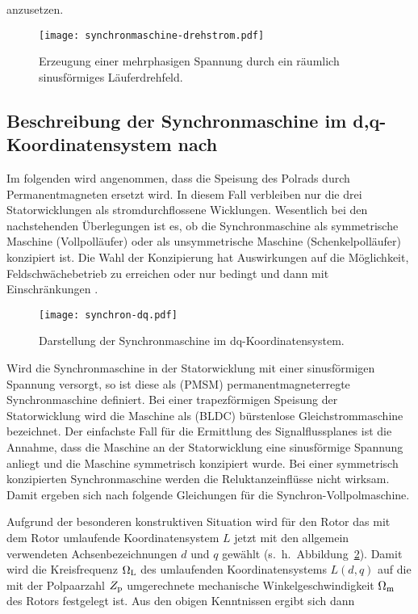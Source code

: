 anzusetzen.

\begin{figure}[!htb]
\centering
\texttt{[image: synchronmaschine-drehstrom.pdf]}
\label{fig:drehstromwicklung}
\caption{Erzeugung einer mehrphasigen Spannung durch ein räumlich sinusförmiges Läuferdrehfeld.}
\end{figure}

\subsection{Beschreibung der Synchronmaschine im d,q-Koordinatensystem nach \textcite{schroder2000}}

Im folgenden wird angenommen, dass die Speisung des Polrads durch Permanentmagneten ersetzt wird.
In diesem Fall verbleiben nur die drei Statorwicklungen als stromdurchflossene Wicklungen.
Wesentlich bei den nachstehenden Überlegungen ist es, ob die Synchronmaschine als symmetrische Maschine (Vollpolläufer) oder als unsymmetrische Maschine (Schenkelpolläufer) konzipiert ist.
Die Wahl der Konzipierung hat Auswirkungen auf die Möglichkeit, Feldschwächebetrieb zu erreichen oder nur bedingt und dann mit Einschränkungen \autocite[S.~291]{schroder2000}.

\begin{figure}[!htb]
\centering
\texttt{[image: synchron-dq.pdf]}
\label{fig:synchron-dq}
\caption{Darstellung der Synchronmaschine im dq-Koordinatensystem.}
\end{figure}

Wird die Synchronmaschine in der Statorwicklung mit einer sinusförmigen Spannung versorgt, so ist diese als (PMSM) permanentmagneterregte Synchronmaschine definiert.
Bei einer trapezförmigen Speisung der Statorwicklung wird die Maschine als (BLDC) bürstenlose Gleichstrommaschine bezeichnet.
Der einfachste Fall für die Ermittlung des Signalflussplanes ist die Annahme, dass die Maschine an der Statorwicklung eine sinusförmige Spannung anliegt und die Maschine symmetrisch konzipiert wurde.
Bei einer symmetrisch konzipierten Synchronmaschine werden die Reluktanzeinflüsse nicht wirksam.
Damit ergeben sich nach \textcite[S.~291]{schroder2000} folgende Gleichungen für die Synchron-Vollpolmaschine.

Aufgrund der besonderen konstruktiven Situation wird für den Rotor das mit dem Rotor umlaufende Koordinatensystem $L$ jetzt mit den allgemein verwendeten Achsenbezeichnungen $d$ und $q$ gewählt (s.~h.~Abbildung~\ref{fig:synchron-dq}).
Damit wird die Kreisfrequenz $\Omega_{\mathrm{L}}$ des umlaufenden Koordinatensystems $L (d, q)$ auf die mit der Polpaarzahl $Z_{\mathrm{p}}$ umgerechnete mechanische Winkelgeschwindigkeit $\Omega_{\mathrm{m}}$ des Rotors festgelegt ist.
Aus den obigen Kenntnissen ergibt sich dann \textcite[S.~682]{schroder2001}

